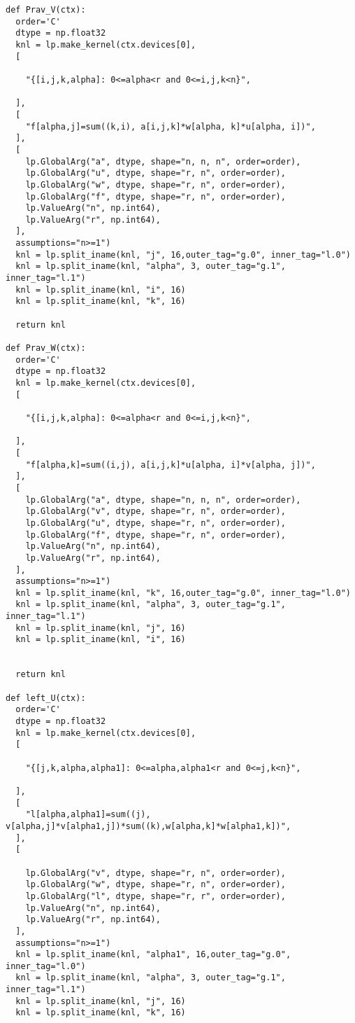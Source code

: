 \documentclass{scrartcl}
\begin{document}
\begin{verbatim}
def Prav_V(ctx):
  order='C'
  dtype = np.float32
  knl = lp.make_kernel(ctx.devices[0], 
  [

    "{[i,j,k,alpha]: 0<=alpha<r and 0<=i,j,k<n}",

  ],
  [
    "f[alpha,j]=sum((k,i), a[i,j,k]*w[alpha, k]*u[alpha, i])",
  ],
  [
    lp.GlobalArg("a", dtype, shape="n, n, n", order=order),
    lp.GlobalArg("u", dtype, shape="r, n", order=order),
    lp.GlobalArg("w", dtype, shape="r, n", order=order),
    lp.GlobalArg("f", dtype, shape="r, n", order=order),
    lp.ValueArg("n", np.int64),
    lp.ValueArg("r", np.int64),
  ],
  assumptions="n>=1")
  knl = lp.split_iname(knl, "j", 16,outer_tag="g.0", inner_tag="l.0")
  knl = lp.split_iname(knl, "alpha", 3, outer_tag="g.1", inner_tag="l.1")
  knl = lp.split_iname(knl, "i", 16)
  knl = lp.split_iname(knl, "k", 16) 

  return knl

def Prav_W(ctx):
  order='C'
  dtype = np.float32
  knl = lp.make_kernel(ctx.devices[0], 
  [

    "{[i,j,k,alpha]: 0<=alpha<r and 0<=i,j,k<n}",

  ],
  [
    "f[alpha,k]=sum((i,j), a[i,j,k]*u[alpha, i]*v[alpha, j])",
  ],
  [
    lp.GlobalArg("a", dtype, shape="n, n, n", order=order),
    lp.GlobalArg("v", dtype, shape="r, n", order=order),
    lp.GlobalArg("u", dtype, shape="r, n", order=order),
    lp.GlobalArg("f", dtype, shape="r, n", order=order),
    lp.ValueArg("n", np.int64),
    lp.ValueArg("r", np.int64),
  ],
  assumptions="n>=1")
  knl = lp.split_iname(knl, "k", 16,outer_tag="g.0", inner_tag="l.0")
  knl = lp.split_iname(knl, "alpha", 3, outer_tag="g.1", inner_tag="l.1")
  knl = lp.split_iname(knl, "j", 16)
  knl = lp.split_iname(knl, "i", 16) 


  return knl

def left_U(ctx):
  order='C'
  dtype = np.float32
  knl = lp.make_kernel(ctx.devices[0], 
  [

    "{[j,k,alpha,alpha1]: 0<=alpha,alpha1<r and 0<=j,k<n}",

  ],
  [
    "l[alpha,alpha1]=sum((j), v[alpha,j]*v[alpha1,j])*sum((k),w[alpha,k]*w[alpha1,k])",
  ],
  [

    lp.GlobalArg("v", dtype, shape="r, n", order=order),
    lp.GlobalArg("w", dtype, shape="r, n", order=order),
    lp.GlobalArg("l", dtype, shape="r, r", order=order),
    lp.ValueArg("n", np.int64),
    lp.ValueArg("r", np.int64),
  ],
  assumptions="n>=1")
  knl = lp.split_iname(knl, "alpha1", 16,outer_tag="g.0", inner_tag="l.0")
  knl = lp.split_iname(knl, "alpha", 3, outer_tag="g.1", inner_tag="l.1")
  knl = lp.split_iname(knl, "j", 16)
  knl = lp.split_iname(knl, "k", 16)


\end{verbatim}
\end{document}

